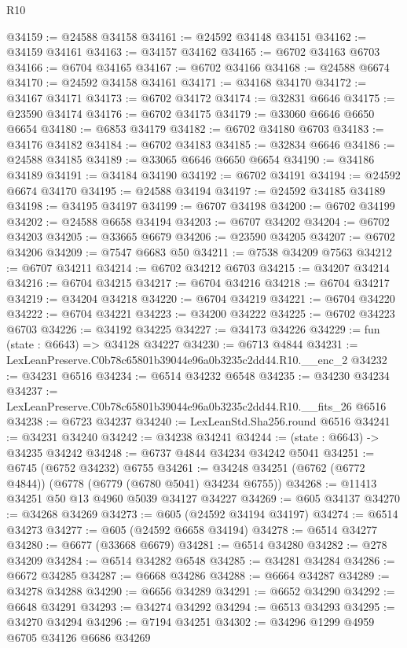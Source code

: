 \begin{lexlean}{R10}
\begin{coremodule}
@34159 := @24588 @34158
@34161 := @24592 @34148 @34151
@34162 := @34159 @34161
@34163 := @34157 @34162
@34165 := @6702 @34163 @6703
@34166 := @6704 @34165
@34167 := @6702 @34166
@34168 := @24588 @6674
@34170 := @24592 @34158 @34161
@34171 := @34168 @34170
@34172 := @34167 @34171
@34173 := @6702 @34172
@34174 := @32831 @6646
@34175 := @23590 @34174
@34176 := @6702 @34175
@34179 := @33060 @6646 @6650 @6654
@34180 := @6853 @34179
@34182 := @6702 @34180 @6703
@34183 := @34176 @34182
@34184 := @6702 @34183
@34185 := @32834 @6646
@34186 := @24588 @34185
@34189 := @33065 @6646 @6650 @6654
@34190 := @34186 @34189
@34191 := @34184 @34190
@34192 := @6702 @34191
@34194 := @24592 @6674 @34170
@34195 := @24588 @34194
@34197 := @24592 @34185 @34189
@34198 := @34195 @34197
@34199 := @6707 @34198
@34200 := @6702 @34199
@34202 := @24588 @6658 @34194
@34203 := @6707 @34202
@34204 := @6702 @34203
@34205 := @33665 @6679
@34206 := @23590 @34205
@34207 := @6702 @34206
@34209 := @7547 @6683 @50
@34211 := @7538 @34209 @7563
@34212 := @6707 @34211
@34214 := @6702 @34212 @6703
@34215 := @34207 @34214
@34216 := @6704 @34215
@34217 := @6704 @34216
@34218 := @6704 @34217
@34219 := @34204 @34218
@34220 := @6704 @34219
@34221 := @6704 @34220
@34222 := @6704 @34221
@34223 := @34200 @34222
@34225 := @6702 @34223 @6703
@34226 := @34192 @34225
@34227 := @34173 @34226
@34229 := fun (state : @6643) => @34128 @34227
@34230 := @6713 @4844
@34231 := LexLeanPreserve.C0b78c65801b39044e96a0b3235c2dd44.R10.__enc_2
@34232 := @34231 @6516
@34234 := @6514 @34232 @6548
@34235 := @34230 @34234
@34237 := LexLeanPreserve.C0b78c65801b39044e96a0b3235c2dd44.R10.__fits_26 @6516
@34238 := @6723 @34237
@34240 := LexLeanStd.Sha256.round @6516
@34241 := @34231 @34240
@34242 := @34238 @34241
@34244 := (state : @6643) -> @34235 @34242
@34248 := @6737 @4844 @34234 @34242 @5041
@34251 := @6745 (@6752 @34232) @6755
@34261 := @34248 @34251 (@6762 (@6772 @4844)) (@6778 (@6779 (@6780 @5041) @34234 @6755))
@34268 := @11413 @34251 @50 @13 @4960 @5039 @34127 @34227
@34269 := @605 @34137
@34270 := @34268 @34269
@34273 := @605 (@24592 @34194 @34197)
@34274 := @6514 @34273
@34277 := @605 (@24592 @6658 @34194)
@34278 := @6514 @34277
@34280 := @6677 (@33668 @6679)
@34281 := @6514 @34280
@34282 := @278 @34209
@34284 := @6514 @34282 @6548
@34285 := @34281 @34284
@34286 := @6672 @34285
@34287 := @6668 @34286
@34288 := @6664 @34287
@34289 := @34278 @34288
@34290 := @6656 @34289
@34291 := @6652 @34290
@34292 := @6648 @34291
@34293 := @34274 @34292
@34294 := @6513 @34293
@34295 := @34270 @34294
@34296 := @7194 @34251
@34302 := @34296 @1299 @4959 @6705 @34126 @6686 @34269

\end{coremodule}
\end{lexlean}
